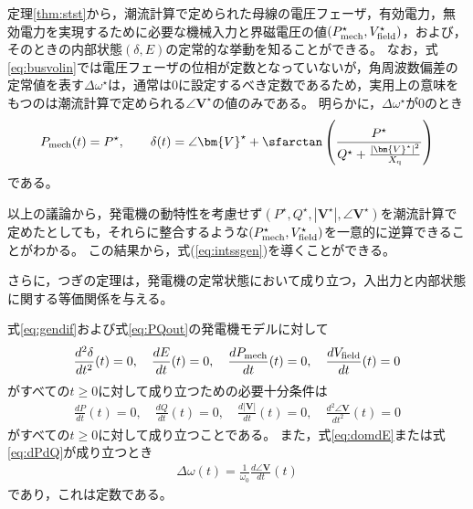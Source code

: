 \documentclass[tombow,dvipdfmx]{corona-a5-1.1}
\begin{document}
定理\ref{thm:stst}から，潮流計算で定められた母線の電圧フェーザ，有効電力，無効電力を実現するために必要な機械入力と界磁電圧の値$(P_{\rm mech}^{\star},V_{\rm field}^{\star})$，および，そのときの内部状態$(\delta,E)$の定常的な挙動を知ることができる。
なお，式\ref{eq:busvolin}では電圧フェーザの位相が定数となっていないが，角周波数偏差の定常値を表す$\Delta \omega^{\star}$は，通常は0に設定するべき定数であるため，実用上の意味をもつのは潮流計算で定められる$\angle \bm{V}^{\star}$の値のみである。
明らかに，$\Delta \omega^{\star}$が0のとき
\begin{align*}
P_{{\rm mech}}(t) =    P^{\star},\qquad
\delta (t)  = \angle \bm{V}^{\star}
+ \sfarctan \left( \frac{P^{\star}}{Q^{\star} + \tfrac{ |\bm{V}^{\star}|^2}{X_{\rm q}} } \right)
\end{align*}
である。

以上の議論から，発電機の動特性を考慮せず$(P^{\star},Q^{\star},|\bm{V}^{\star}|,\angle \bm{V}^{\star})$を潮流計算で定めたとしても，それらに整合するような$(P_{\rm mech}^{\star},V_{\rm field}^{\star})$を一意的に逆算できることがわかる。
この結果から，式(\ref{eq:intssgen})を導くことができる。

さらに，つぎの定理は，発電機の定常状態において成り立つ，入出力と内部状態に関する等価関係を与える。

\begin{定理}[発電機の入出力と内部状態に関する等価関係]
\label{thm:outst}
式\ref{eq:gendif}および式\ref{eq:PQout}の発電機モデルに対して
\begin{align}\label{eq:domdE}
\frac{d^2 \delta}{dt^2}(t)=0
,\quad
\frac{dE}{dt}(t)=0
,\quad
\frac{d P_{\rm mech}}{dt}(t)=0
,\quad
\frac{d V_{\rm field}}{dt}(t)=0
\end{align}
がすべての$t\geq0$に対して成り立つための必要十分条件は
\begin{align}\label{eq:dPdQ}
\frac{dP}{dt}(t)=0
,\quad
\frac{dQ}{dt}(t)=0
,\quad
\frac{d|\bm{V}|}{dt}(t)=0
,\quad
\frac{d^2 \angle \bm{V}}{dt^2}(t)=0
\end{align}
がすべての$t\geq0$に対して成り立つことである。
また，式\ref{eq:domdE}または式\ref{eq:dPdQ}が成り立つとき
\begin{align}\label{eq:frer}
\Delta \omega(t)= \frac{1}{\omega_0}\frac{d \angle \bm{V}}{dt}(t)
\end{align}
であり，これは定数である。
\end{定理}
\end{document}
